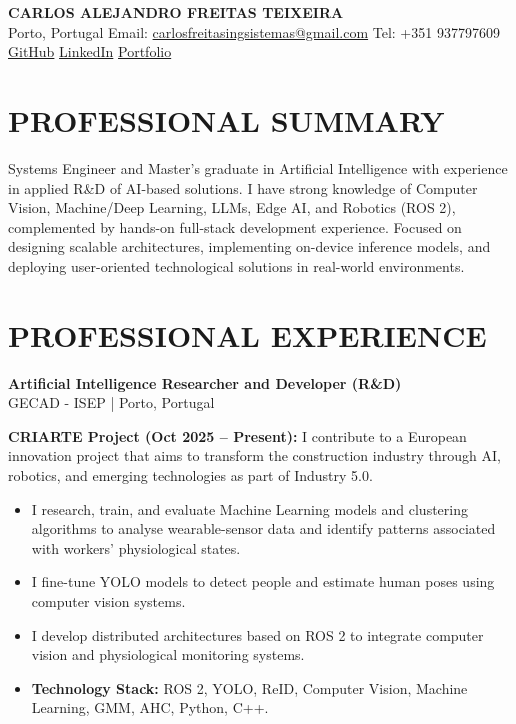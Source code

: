 \documentclass[10pt,a4paper]{article}
\begin{document}
\begin{center}
    {\LARGE\textbf{CARLOS ALEJANDRO FREITAS TEIXEIRA}}\\
    Porto, Portugal \textbar{} Email: \href{mailto:carlosfreitasingsistemas@gmail.com}{carlosfreitasingsistemas@gmail.com}
    \textbar{} Tel: +351 937797609\\
    \href{https://github.com/CarlosFreitasING}{GitHub}
    \textbar{} \href{https://www.linkedin.com/in/carlos-alejandro-freitas-teixeira-82921a249/}{LinkedIn}
    \textbar{} \href{https://carlosfreitas32.wixsite.com/portafolio}{Portfolio}
\end{center}

\section*{PROFESSIONAL SUMMARY}
Systems Engineer and Master's graduate in Artificial Intelligence with experience in applied R\&D of AI-based solutions. I have strong knowledge of Computer Vision, Machine/Deep Learning, LLMs, Edge AI, and Robotics (ROS 2), complemented by hands-on full-stack development experience. Focused on designing scalable architectures, implementing on-device inference models, and deploying user-oriented technological solutions in real-world environments.

\section*{PROFESSIONAL EXPERIENCE}

\textbf{\large Artificial Intelligence Researcher and Developer (R\&D)}\\
GECAD - ISEP | Porto, Portugal

\vspace{5pt}
\textbf{CRIARTE Project (Oct 2025 -- Present):} I contribute to a European innovation project that aims to transform the construction industry through AI, robotics, and emerging technologies as part of Industry 5.0.
\begin{itemize}
    \item I research, train, and evaluate Machine Learning models and clustering algorithms to analyse wearable-sensor data and identify patterns associated with workers' physiological states.
    \item I fine-tune YOLO models to detect people and estimate human poses using computer vision systems.
    \item I develop distributed architectures based on ROS 2 to integrate computer vision and physiological monitoring systems.
    \item \textbf{Technology Stack:} ROS 2, YOLO, ReID, Computer Vision, Machine Learning, GMM, AHC, Python, C++.
\end{itemize}
\end{document}
